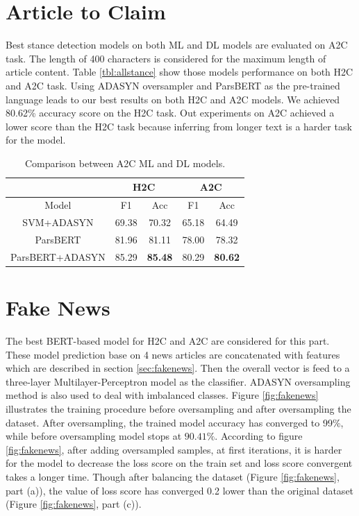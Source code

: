 \section{Article to Claim}

Best stance detection models on both \ac{ML} and \ac{DL} models are evaluated on \ac{A2C} task. The length of 400 characters is considered for the maximum length of article content. Table \ref{tbl:allstance} show those models performance on both \ac{H2C} and \ac{A2C} task. Using \ac{ADASYN} oversampler and \ac{ParsBERT} as the pre-trained language leads to our best results on both \ac{H2C} and \ac{A2C} models. We achieved 80.62\% accuracy score on the \ac{H2C} task. Out experiments on \ac{A2C} achieved a lower score than the \ac{H2C} task because inferring from longer text is a harder task for the model.  

\begin{table}[t]
	\centering
	\small
	\caption{Comparison between \ac{A2C} \ac{ML} and \ac{DL} models.}
	\def\arraystretch{1.3}%
	\setlength{\extrarowheight}{5pt}%
	\begin{tabular}{|c|c|c|c|c|}
		\hline
		{} & \multicolumn{2}{c|}{\ac{H2C}} &  \multicolumn{2}{c|}{\ac{A2C}}\\
		\hline 
		{Model} & {F1} & {\ac{Acc}} & {F1} & {\ac{Acc}}\\
		\hline	\hline
		{\ac{SVM}+\ac{ADASYN}} & {69.38} & {70.32} & {65.18} & {64.49}\\
		\hline
		{\ac{ParsBERT}} & {81.96} & {81.11} & {78.00} & {78.32}\\
		\hline
		{\ac{ParsBERT}+\ac{ADASYN}} & {85.29} & \textbf{{85.48}} & {80.29} & \textbf{{80.62}}\\
		\hline
	\end{tabular}
	\label{tbl:a2c}
\end{table}

\section{Fake News}
The best \ac{BERT}-based model for \ac{H2C} and \ac{A2C} are considered for this part. These model prediction base on 4 news articles are concatenated with features which are described in section \ref{sec:fakenews}. Then the overall vector is feed to a three-layer Multilayer-Perceptron model as the classifier. \ac{ADASYN} oversampling method is also used to deal with imbalanced classes. Figure \ref{fig:fakenews} illustrates the training procedure before oversampling and after oversampling the dataset. After oversampling, the trained model accuracy has converged to 99\%, while before oversampling model stops at $90.41\%$. According to figure \ref{fig:fakenews}, after adding oversampled samples, at first iterations, it is harder for the model to decrease the loss score on the train set and loss score convergent takes a longer time. Though after balancing the dataset (Figure \ref{fig:fakenews}, part (a)), the value of loss score has converged 0.2 lower than the original dataset (Figure \ref{fig:fakenews}, part (c)).

